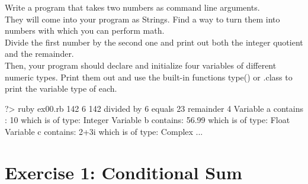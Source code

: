 \documentclass{42-en}
\begin{document}
Write a program that takes two numbers as command line arguments.\\

They will come into your program as Strings. Find a way to turn them into numbers with which you can perform math.\\

Divide the first number by the second one and print out both the integer quotient and the remainder.\\

Then, your program should declare and initialize four variables of different numeric types.
Print them out and use the built-in functions type() or .class to print the variable type of each. 

\begin{42console}
	?> ruby ex00.rb 142 6
	142 divided by 6 equals 23 remainder 4
	Variable a contains : 10  which is of type: Integer
	Variable b contains: 56.99  which is of type: Float
	Variable c contains: 2+3i  which is of type: Complex
	...
\end{42console}



\chapter{Exercise 1: Conditional Sum}

\makeheaderfiles
\end{document}
